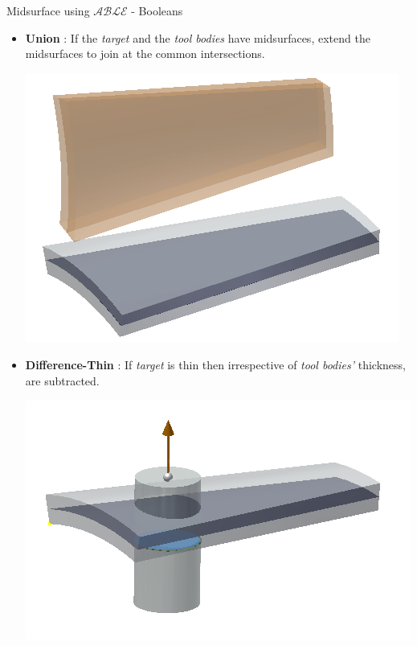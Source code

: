 \begin{frame}{Midsurface using $\mathcal{ABLE}$ - Booleans}

\begin{itemize}[noitemsep,label=\textbullet,topsep=2pt,parsep=2pt,partopsep=2pt]%

\item {\bf Union} : If the {\em target} and the {\em tool bodies} have midsurfaces, extend the midsurfaces to join at the common intersections.

\includegraphics[scale=0.125]{../Common/images//Midsurf_unite.png} 

\item {\bf Difference-Thin} : If {\em target} is thin then irrespective of {\em tool bodies'} thickness, are subtracted.

\includegraphics[scale=0.125]{../Common/images//Midsurf_diffthin.png}


\end{itemize}
\end{frame}
